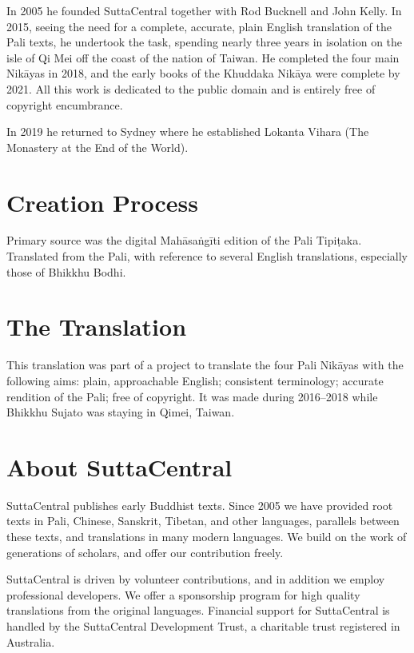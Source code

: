 \documentclass[12pt,openany]{book}%
\begin{document}
In 2005 he founded SuttaCentral together with Rod Bucknell and John Kelly. In 2015, seeing the need for a complete, accurate, plain English translation of the Pali texts, he undertook the task, spending nearly three years in isolation on the isle of Qi Mei off the coast of the nation of Taiwan. He completed the four main \textsanskrit{Nikāyas} in 2018, and the early books of the Khuddaka \textsanskrit{Nikāya} were complete by 2021. All this work is dedicated to the public domain and is entirely free of copyright encumbrance. 

In 2019 he returned to Sydney where he established Lokanta Vihara (The Monastery at the End of the World). 

\section*{Creation Process}

Primary source was the digital \textsanskrit{Mahāsaṅgīti} edition of the Pali \textsanskrit{Tipiṭaka}. Translated from the Pali, with reference to several English translations, especially those of Bhikkhu Bodhi.

\section*{The Translation}

This translation was part of a project to translate the four Pali \textsanskrit{Nikāyas} with the following aims: plain, approachable English; consistent terminology; accurate rendition of the Pali; free of copyright. It was made during 2016–2018 while Bhikkhu Sujato was staying in Qimei, Taiwan.

\section*{About SuttaCentral}

SuttaCentral publishes early Buddhist texts. Since 2005 we have provided root texts in Pali, Chinese, Sanskrit, Tibetan, and other languages, parallels between these texts, and translations in many modern languages. We build on the work of generations of scholars, and offer our contribution freely.

SuttaCentral is driven by volunteer contributions, and in addition we employ professional developers. We offer a sponsorship program for high quality translations from the original languages. Financial support for SuttaCentral is handled by the SuttaCentral Development Trust, a charitable trust registered in Australia.
\end{document}
